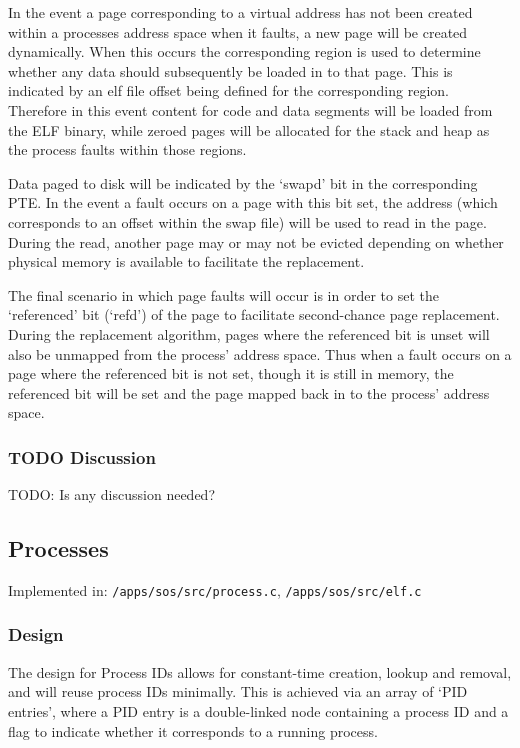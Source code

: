 \documentclass[a4paper,12pt]{article}
\begin{document}
In the event a page corresponding to a virtual address has not been created
within a processes address space when it faults, a new page will be created
dynamically.  When this occurs the corresponding region is used to determine
whether any data should subsequently be loaded in to that page.  This is
indicated by an elf file offset being defined for the corresponding region.
Therefore in this event content for code and data segments will be loaded from
the ELF binary, while zeroed pages will be allocated for the stack and heap as
the process faults within those regions.

Data paged to disk will be indicated by the `swapd' bit in the corresponding
PTE.  In the event a fault occurs on a page with this bit set, the address
(which corresponds to an offset within the swap file) will be used to read in
the page.  During the read, another page may or may not be evicted depending
on whether physical memory is available to facilitate the replacement.

The final scenario in which page faults will occur is in order to set the
`referenced' bit (`refd') of the page to facilitate second-chance page
replacement.  During the replacement algorithm, pages where the referenced bit
is unset will also be unmapped from the process' address space.  Thus when a
fault occurs on a page where the referenced bit is not set, though it is still
in memory, the referenced bit will be set and the page mapped back in to the
process' address space.

\subsubsection{TODO Discussion}
TODO: Is any discussion needed?

\subsection{Processes}
Implemented in: \texttt{/apps/sos/src/process.c}, \texttt{/apps/sos/src/elf.c}

\subsubsection{Design}
The design for Process IDs allows for constant-time creation, lookup and
removal, and will reuse process IDs minimally.  This is achieved via an array
of `PID entries', where a PID entry is a double-linked node containing a
process ID and a flag to indicate whether it corresponds to a running process.
\end{document}
